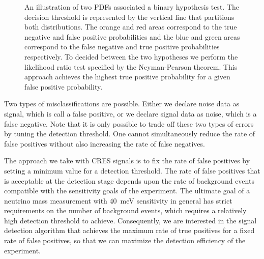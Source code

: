 \begin{figure}[htbp]
\begin{subfigure}{0.48\textwidth}
        \caption{}
    \end{subfigure}
    \caption{An illustration of two PDFs associated a binary hypothesis test. The decision threshold is represented by the vertical line that partitions both distributions. The orange and red areas correspond to the true negative and false positive probabilities and the blue and green areas correspond to the false negative and true positive probabilities respectively. To decided between the two hypotheses we perform the likelihood ratio test specified by the Neyman-Pearson theorem. This approach achieves the highest true positive probability for a given false positive probability.}
    \label{fig:chap4-detection-threshold}
\end{figure}
Two types of misclassifications are possible. Either we declare noise data as signal, which is call a false positive, or we declare signal data as noise, which is a false negative. Note that it is only possible to trade off these two types of errors by tuning the detection threshold. One cannot simultaneously reduce the rate of false positives without also increasing the rate of false negatives.

The approach we take with CRES signals is to fix the rate of false positives by setting a minimum value for a detection threshold. The rate of false positives that is acceptable at the detection stage depends upon the rate of background events compatible with the sensitivity goals of the experiment. The ultimate goal of a neutrino mass measurement with 40~meV sensitivity in general has strict requirements on the number of background events, which requires a relatively high detection threshold to achieve. Consequently, we are interested in the signal detection algorithm that achieves the maximum rate of true positives for a fixed rate of false positives, so that we can maximize the detection efficiency of the experiment.


